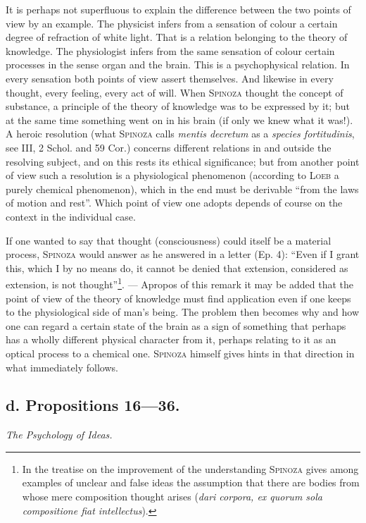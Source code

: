 \documentclass[12pt]{article}
\newcommand{\opage}[1]{\marginnote{\footnotesize\textit{[#1]}}}
\begin{document}
It is perhaps not superfluous to explain the difference between the two points of view by
an example. The physicist infers from a sensation of colour a certain degree of refraction
of white light. That is a relation belonging to the theory of knowledge. The physiologist
infers from the same sensation of colour certain processes in the sense organ and the brain.
This is a psychophysical relation. In every sensation both points of view assert themselves.
And likewise in every thought, every feeling, every act of will. When \textsc{Spinoza}
thought the concept of substance, a principle of the theory of knowledge was to be expressed
by it; but at the same time something went on in his brain (if only we knew what it was!). A
heroic resolution (what \textsc{Spinoza} calls \textit{mentis decretum} as a
\textit{species fortitudinis}, see III, 2 Schol. and 59 Cor.) concerns different
relations in and outside the resolving subject, and on this rests its ethical significance;
but from another point of view such a resolution is a physiological phenomenon (according to
\textsc{Loeb} a purely chemical phenomenon), which in the end must be derivable ``from the
laws of motion and rest''. Which point of view one adopts depends of course on the context
in the individual case.

If one wanted to say that thought (consciousness) could itself be a material process,
\textsc{Spinoza} would answer as he answered in a letter (Ep. 4): ``Even if I grant this,
which I by no means do, it cannot be denied that extension, considered as extension, is not
thought''\footnote{In the treatise on the improvement of the understanding
\textsc{Spinoza} gives among examples of unclear and false ideas the assumption that there
are bodies from whose mere composition thought arises (\textit{dari corpora, ex quorum sola
compositione fiat intellectus}).}. --- Apropos of this remark it may be added that the point
of view of the theory of knowledge must find application even if one keeps to the
physiological side of man's being. The problem then becomes why and how one can regard a
certain state of the brain as a sign of something that perhaps has a wholly different
physical character from it, perhaps \opage{45}relating to it as an optical process to a
chemical one. \textsc{Spinoza} himself gives hints in that direction in what immediately
follows.

\subsection*{d. Propositions 16---36.}
\begin{center}\textit{The Psychology of Ideas.}\end{center}
\end{document}
